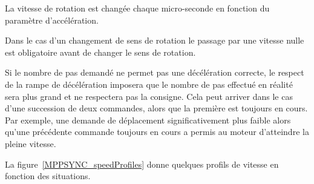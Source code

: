 \documentclass[11pt,a4paper,oneside,onecolumn]{article}
\begin{document}
La vitesse de rotation est changée chaque micro-seconde en fonction du paramètre d'accélération.

Dans le cas d'un changement de sens de rotation le passage par une vitesse nulle est obligatoire avant de changer le sens de rotation.

Si le nombre de pas demandé ne permet pas une décélération correcte, le respect de la rampe de décélération imposera que le nombre de pas effectué en réalité sera plus grand et ne respectera pas la consigne. Cela peut arriver dans le cas d'une succession de deux commandes, alors que la première est toujours en cours. Par exemple, une demande de déplacement significativement plus faible alors qu'une précédente commande toujours en cours a permis au moteur d'atteindre la pleine vitesse. 

La figure~\ref{MPPSYNC_speedProfiles} donne quelques profils de vitesse en fonction des situations.
\end{document}
